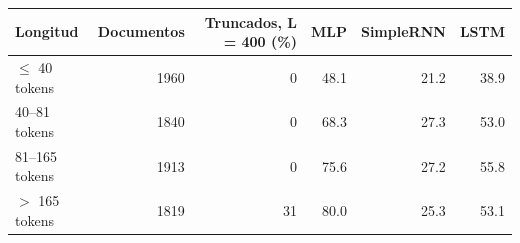 \begin{tabular}{lrrrrr}
\toprule
Longitud & Documentos & Truncados, L = 400 (\%) & MLP & SimpleRNN & LSTM \\
\midrule
$\le$ 40 tokens & 1960 & 0 & 48.1 & 21.2 & 38.9 \\
40–81 tokens & 1840 & 0 & 68.3 & 27.3 & 53.0 \\
81–165 tokens & 1913 & 0 & 75.6 & 27.2 & 55.8 \\
$>$ 165 tokens & 1819 & 31 & 80.0 & 25.3 & 53.1 \\
\bottomrule
\end{tabular}

